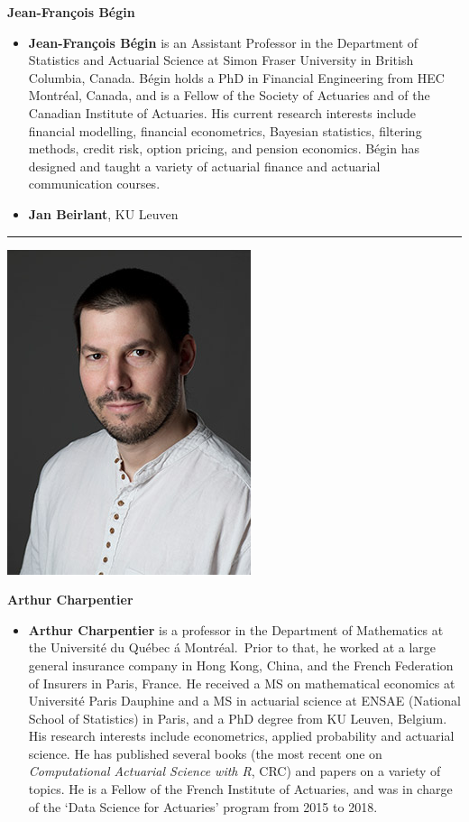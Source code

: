 \documentclass[
  12pt,
  krantz2]{Format/krantzNoCorner}
\providecommand{\tightlist}{%
  \setlength{\itemsep}{0pt}\setlength{\parskip}{0pt}}
\begin{document}
\begin{center}
\textbf{ Jean-François Bégin }
\end{center}

\begin{itemize}
\item
  \textbf{Jean-François Bégin} is an Assistant Professor in the Department of Statistics and Actuarial Science at Simon Fraser University in British Columbia, Canada. Bégin holds a PhD in Financial Engineering from HEC Montréal, Canada, and is a Fellow of the Society of Actuaries and of the Canadian Institute of Actuaries. His current research interests include financial modelling, financial econometrics, Bayesian statistics, filtering methods, credit risk, option pricing, and pension economics. Bégin has designed and taught a variety of actuarial finance and actuarial communication courses.
\item
  \textbf{Jan Beirlant}, KU Leuven
\end{itemize}

\begin{center}\rule{0.5\linewidth}{0.5pt}\end{center}

\begin{center}\includegraphics[width=0.2\linewidth,height=0.3\textheight]{ContributorPics/Charpentier} \end{center}

\begin{center}
\textbf{ Arthur Charpentier }
\end{center}

\begin{itemize}
\tightlist
\item
  \textbf{Arthur Charpentier} is a professor in the Department of Mathematics at the Université du Québec á Montréal.~Prior to that, he worked at a large general insurance company in Hong Kong, China, and the French Federation of Insurers in Paris, France. He received a MS on mathematical economics at Université Paris Dauphine and a MS in actuarial science at ENSAE (National School of Statistics) in Paris, and a PhD degree from KU Leuven, Belgium. His research interests include econometrics, applied probability and actuarial science. He has published several books (the most recent one on \emph{Computational Actuarial Science with R}, CRC) and papers on a variety of topics. He is a Fellow of the French Institute of Actuaries, and was in charge of the `Data Science for Actuaries' program from 2015 to 2018.
\end{itemize}
\end{document}

